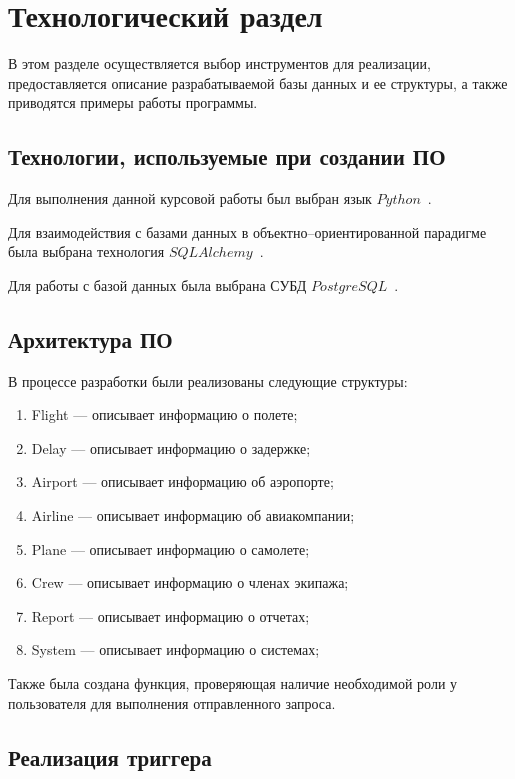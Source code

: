 \chapter{Технологический раздел}

В этом разделе осуществляется выбор инструментов для реализации, предоставляется описание разрабатываемой базы данных и ее структуры, а также приводятся примеры работы программы.

\section{Технологии, используемые при \newline создании ПО}

Для выполнения данной курсовой работы был выбран язык \newline $Python$~\cite{python-lang}.

Для взаимодействия с базами данных в объектно--ориентированной парадигме была выбрана технология $SQLAlchemy$~\cite{sqlalchemy}.

Для работы с базой данных была выбрана СУБД $PostgreSQL$~\cite{postgresql}.

\section{Архитектура ПО}

В процессе разработки были реализованы следующие структуры:
\begin{enumerate}[label=\arabic*)]
    \item Flight --- описывает информацию о полете;
    \item Delay --- описывает информацию о задержке;
    \item Airport --- описывает информацию об аэропорте;
    \item Airline --- описывает информацию об авиакомпании;
    \item Plane --- описывает информацию о самолете;
    \item Crew --- описывает информацию о членах экипажа;
    \item Report --- описывает информацию о отчетах;
    \item System --- описывает информацию о системах;
\end{enumerate}

Также была создана функция, проверяющая наличие необходимой роли у пользователя для выполнения отправленного запроса.

\section{Реализация триггера}

